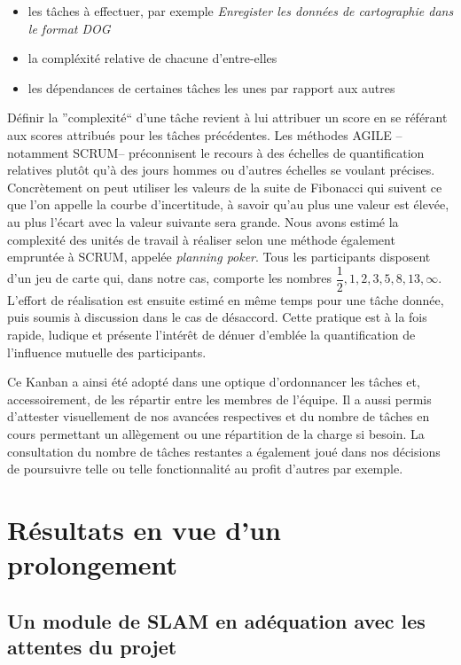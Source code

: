   \begin{itemize}
   \item les tâches à effectuer, par exemple \emph{Enregister les données de cartographie dans le format DOG}
   \item la compléxité relative de chacune d'entre-elles 
   \item les dépendances de certaines tâches les unes par rapport aux autres
  \end{itemize}

  Définir la ''complexité`` d'une tâche revient à lui attribuer un score en se référant aux scores attribués pour les tâches précédentes. 
  Les méthodes AGILE --notamment SCRUM-- préconnisent le recours à des échelles de quantification relatives plutôt qu'à des jours hommes ou d'autres échelles se voulant précises. 
  Concrètement on peut utiliser les valeurs de la suite de Fibonacci qui suivent ce que l'on appelle la courbe d'incertitude, à savoir qu'au plus une valeur est élevée, au plus l'écart avec la valeur suivante sera grande. 
  Nous avons estimé la complexité des unités de travail à réaliser selon une méthode également empruntée à SCRUM, appelée \emph{planning poker}. 
  Tous les participants disposent d'un jeu de carte qui, dans notre cas, comporte les nombres $\dfrac{1}2, 1, 2, 3, 5, 8, 13, \infty$. 
  L'effort de réalisation est ensuite estimé en même temps pour une tâche donnée, puis soumis à discussion dans le cas de désaccord. 
  Cette pratique est à la fois rapide, ludique et présente l'intérêt de dénuer d'emblée la quantification de l'influence mutuelle des participants. 
  
  Ce Kanban a ainsi été adopté dans une optique d'ordonnancer les tâches et, accessoirement, de les répartir entre les membres de l'équipe. 
  Il a aussi permis d'attester visuellement de nos avancées respectives et du nombre de tâches en cours permettant un allègement ou une répartition de la charge si besoin.
  La consultation du nombre de tâches restantes a également joué dans nos décisions de poursuivre telle ou telle fonctionnalité au profit d'autres par exemple. 
  
\section{Résultats en vue d'un prolongement}  
  \subsection{Un module de SLAM en adéquation avec les attentes du projet}
  
